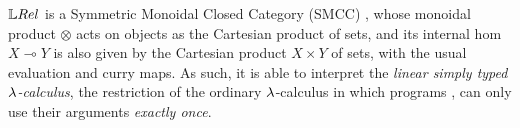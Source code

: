 $\LREL$ is a Symmetric Monoidal Closed Category (SMCC) \cite[Section III.A]{Manzo2013}, %
whose monoidal product $\otimes$ acts on objects as the Cartesian product of sets, %
 and its internal hom $X\multimap Y$ is also given by the Cartesian product $X\times Y$ of sets, with the usual evaluation and curry maps.
As such, it is able to interpret the \emph{linear simply typed $\lambda$-calculus}, the restriction of the ordinary $\lambda$-calculus in which programs ,%
can only use their arguments \emph{exactly once}. %


